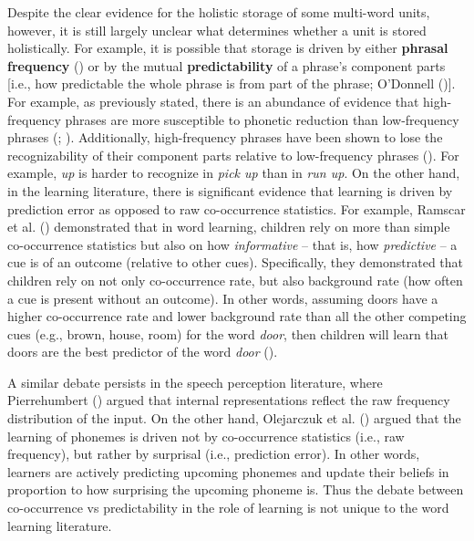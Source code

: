 \documentclass[
  12pt,
  letterpaper,
]{scrreport}
\begin{document}
Despite the clear evidence for the holistic storage of some multi-word
units, however, it is still largely unclear what determines whether a
unit is stored holistically. For example, it is possible that storage is
driven by either \textbf{phrasal frequency}
() or by the mutual
\textbf{predictability} of a phrase's component parts {[}i.e., how
predictable the whole phrase is from part of the phrase; O'Donnell
(){]}. For
example, as previously stated, there is an abundance of evidence that
high-frequency phrases are more susceptible to phonetic reduction than
low-frequency phrases (;
).
Additionally, high-frequency phrases have been shown to lose the
recognizability of their component parts relative to low-frequency
phrases
(). For example, \emph{up} is harder to recognize in
\emph{pick up} than in \emph{run up}. On the other hand, in the learning
literature, there is significant evidence that learning is driven by
prediction error as opposed to raw co-occurrence statistics. For
example, Ramscar et al.
()
demonstrated that in word learning, children rely on more than simple
co-occurrence statistics but also on how \emph{informative} -- that is,
how \emph{predictive} -- a cue is of an outcome (relative to other
cues). Specifically, they demonstrated that children rely on not only
co-occurrence rate, but also background rate (how often a cue is present
without an outcome). In other words, assuming doors have a higher
co-occurrence rate and lower background rate than all the other
competing cues (e.g., brown, house, room) for the word \emph{door}, then
children will learn that doors are the best predictor of the word
\emph{door}
().

A similar debate persists in the speech perception literature, where
Pierrehumbert
() argued that
internal representations reflect the raw frequency distribution of the
input. On the other hand, Olejarczuk et al.
()
argued that the learning of phonemes is driven not by co-occurrence
statistics (i.e., raw frequency), but rather by surprisal (i.e.,
prediction error). In other words, learners are actively predicting
upcoming phonemes and update their beliefs in proportion to how
surprising the upcoming phoneme is. Thus the debate between
co-occurrence vs predictability in the role of learning is not unique to
the word learning literature.
\end{document}
